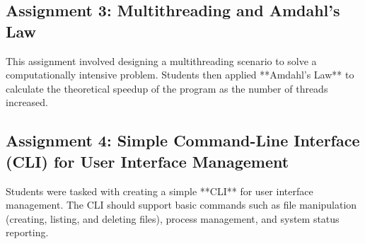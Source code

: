 \documentclass[12pt]{article}
\begin{document}
\subsection{Assignment 3: Multithreading and Amdahl's Law}
This assignment involved designing a multithreading scenario to solve a computationally intensive problem. Students then applied **Amdahl's Law** to calculate the theoretical speedup of the program as the number of threads increased.

\subsection{Assignment 4: Simple Command-Line Interface (CLI) for User Interface Management}
Students were tasked with creating a simple **CLI** for user interface management. The CLI should support basic commands such as file manipulation (creating, listing, and deleting files), process management, and system status reporting.
\end{document}
